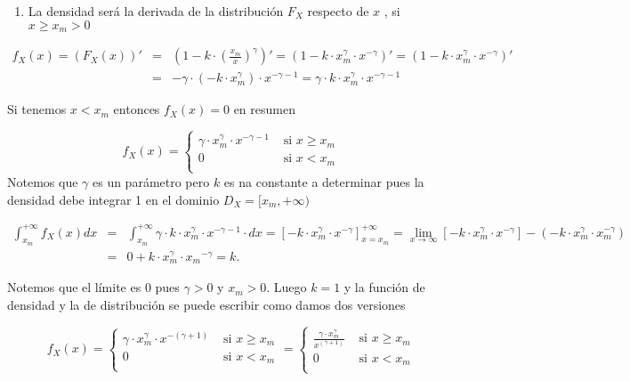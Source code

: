 \documentclass[
]{article}
\providecommand{\tightlist}{%
  \setlength{\itemsep}{0pt}\setlength{\parskip}{0pt}}
\begin{document}
\begin{enumerate}
\def\labelenumi{\alph{enumi})}
\tightlist
\item
  La densidad será la derivada de la distribución \(F_X\) respecto de
  \(x\) , si \(x\geq x_m>0\)
\end{enumerate}

\begin{eqnarray*}
f_X(x)=(F_X(x))'&=& \left(1- k\cdot \left(\frac{x_m}{x}\right)^{\gamma}\right)'=
\left(1- k\cdot x_m^{\gamma} \cdot  x^{-\gamma} \right)'= \left(1- k\cdot x_m^{\gamma} \cdot  x^{-\gamma} \right)'\\
&=& -\gamma\cdot(-k\cdot x_m^{\gamma}) \cdot  x^{-\gamma-1}=\gamma\cdot k\cdot x_m^{\gamma} \cdot  x^{-\gamma-1}
\end{eqnarray*}

Si tenemos \(x<x_m\) entonces \(f_X(x)=0\) en resumen

\[
f_X(x)=\left\{
\begin{array}{ll}
\gamma \cdot x_m^{\gamma} \cdot  x^{-\gamma-1} &\mbox{ si } x\geq x_m\\
0 &\mbox{ si } x< x_m\\
\end{array}
\right.
\] Notemos que \(\gamma\) es un parámetro pero \(k\) es na constante a
determinar pues la densidad debe integrar 1 en el dominio
\(D_X=[x_m,+\infty)\)

\begin{eqnarray*}
\int_{x_m}^{+\infty} f_X(x) dx &=&\int_{x_m}^{+\infty} \gamma \cdot k\cdot x_m^{\gamma} \cdot  x^{-\gamma-1}\cdot dx=
\left[- k\cdot x_m^{\gamma} \cdot  x^{-\gamma}\right]_{x=x_m}^{+\infty}=
\lim_{x\to \infty} \left[- k\cdot x_m^{\gamma} \cdot  x^{-\gamma}\right] - \left(- k\cdot x_m^{\gamma} \cdot  x_m^{-\gamma}\right)\\
&=& 0 + k\cdot x_m^{\gamma} \cdot  {x_m}^{-\gamma}=k.
\end{eqnarray*}

Notemos que el límite es \(0\) pues \(\gamma>0\) y \(x_m>0\). Luego
\(k=1\) y la función de densidad y la de distribución se puede escribir
como damos dos versiones

\[
f_X(x)=\left\{
\begin{array}{ll}
\gamma\cdot x_m^{\gamma} \cdot  x^{-(\gamma+1)} &\mbox{ si } x\geq x_m\\
0 &\mbox{ si } x< x_m\\
\end{array}
\right.=
\left\{
\begin{array}{ll}
\frac{\gamma\cdot x_m^{\gamma}}{x^{(\gamma+1)}} &\mbox{ si } x\geq x_m\\
0 &\mbox{ si } x< x_m\\
\end{array}
\right.
\]
\end{document}
